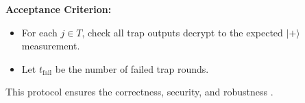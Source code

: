 \noindent
\textbf{Acceptance Criterion:}
\begin{itemize}
  \item For each $j \in T$, check all trap outputs decrypt to the expected
        $|+\rangle$ measurement.
  \item Let $t_{\mathrm{fail}}$ be the number of failed trap rounds.
\end{itemize}

This protocol ensures the correctness, security, and robustness \cite{}.








